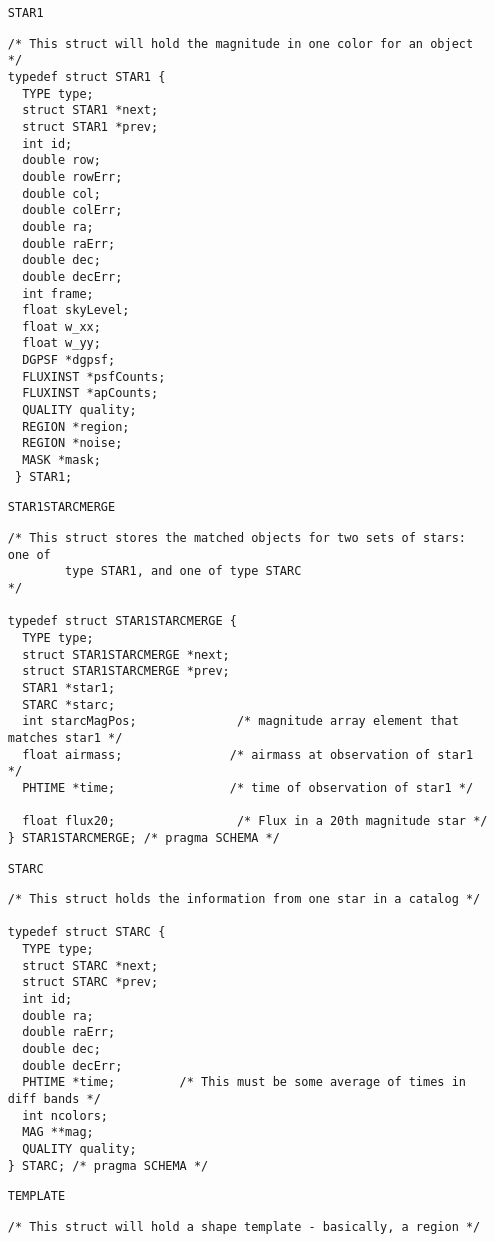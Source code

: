 {\begin{itemize}
\item[{\tt STAR1}]

\begin{verbatim}
/* This struct will hold the magnitude in one color for an object */
typedef struct STAR1 {
  TYPE type;
  struct STAR1 *next;
  struct STAR1 *prev;
  int id;
  double row;
  double rowErr;
  double col;
  double colErr;
  double ra;
  double raErr;
  double dec;
  double decErr;
  int frame;
  float skyLevel;
  float w_xx;
  float w_yy;
  DGPSF *dgpsf;
  FLUXINST *psfCounts;
  FLUXINST *apCounts;
  QUALITY quality;
  REGION *region;
  REGION *noise;
  MASK *mask;
 } STAR1;
\end{verbatim}

\item[{\tt STAR1STARCMERGE}]

\begin{verbatim}
/* This struct stores the matched objects for two sets of stars: one of
        type STAR1, and one of type STARC                               */

typedef struct STAR1STARCMERGE {
  TYPE type;
  struct STAR1STARCMERGE *next;
  struct STAR1STARCMERGE *prev;
  STAR1 *star1;
  STARC *starc;
  int starcMagPos;              /* magnitude array element that matches star1 */
  float airmass;               /* airmass at observation of star1 */
  PHTIME *time;                /* time of observation of star1 */

  float flux20;                 /* Flux in a 20th magnitude star */
} STAR1STARCMERGE; /* pragma SCHEMA */
\end{verbatim}

\item[{\tt STARC}]

\begin{verbatim}
/* This struct holds the information from one star in a catalog */

typedef struct STARC {
  TYPE type;
  struct STARC *next;
  struct STARC *prev;
  int id;
  double ra;
  double raErr;
  double dec;
  double decErr;
  PHTIME *time;         /* This must be some average of times in diff bands */
  int ncolors;
  MAG **mag;
  QUALITY quality;
} STARC; /* pragma SCHEMA */
\end{verbatim}

\item[{\tt TEMPLATE}]

\begin{verbatim}
/* This struct will hold a shape template - basically, a region */


\end{verbatim}
\end{itemize}}
